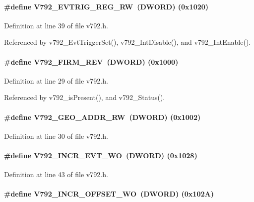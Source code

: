 \paragraph[{V792\_\-EVTRIG\_\-REG\_\-RW}]{\setlength{\rightskip}{0pt plus 5cm}\#define V792\_\-EVTRIG\_\-REG\_\-RW~({\bf DWORD}) (0x1020)}\hfill\label{v792_8h_a323c57cd920e67582ece1cc03b97530e}


Definition at line 39 of file v792.h.

Referenced by v792\_\-EvtTriggerSet(), v792\_\-IntDisable(), and v792\_\-IntEnable().
\paragraph[{V792\_\-FIRM\_\-REV}]{\setlength{\rightskip}{0pt plus 5cm}\#define V792\_\-FIRM\_\-REV~({\bf DWORD}) (0x1000)}\hfill\label{v792_8h_a73656b15650cbb41fd0dcd2c611d0cdb}


Definition at line 29 of file v792.h.

Referenced by v792\_\-isPresent(), and v792\_\-Status().
\paragraph[{V792\_\-GEO\_\-ADDR\_\-RW}]{\setlength{\rightskip}{0pt plus 5cm}\#define V792\_\-GEO\_\-ADDR\_\-RW~({\bf DWORD}) (0x1002)}\hfill\label{v792_8h_aa9f755aa3fe17609995caae5b53bcbaf}


Definition at line 30 of file v792.h.
\paragraph[{V792\_\-INCR\_\-EVT\_\-WO}]{\setlength{\rightskip}{0pt plus 5cm}\#define V792\_\-INCR\_\-EVT\_\-WO~({\bf DWORD}) (0x1028)}\hfill\label{v792_8h_a085112e51e80db0bdc91e415b9191e2b}


Definition at line 43 of file v792.h.
\paragraph[{V792\_\-INCR\_\-OFFSET\_\-WO}]{\setlength{\rightskip}{0pt plus 5cm}\#define V792\_\-INCR\_\-OFFSET\_\-WO~({\bf DWORD}) (0x102A)}\hfill\label{v792_8h_a973cac172ba8db9b9a215cac9b1fe6a3}


